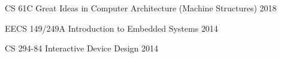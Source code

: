 
\begin{cvhonors}

  \cvhonor
  {CS 61C}
  {Great Ideas in Computer Architecture (Machine Structures)}
  {}
  {2018}

  \cvhonor
  {EECS 149/249A}
  {Introduction to Embedded Systems}
  {}
  {2014}

  \cvhonor
  {CS 294-84}
  {Interactive Device Design}
  {}
  {2014}

\end{cvhonors}

